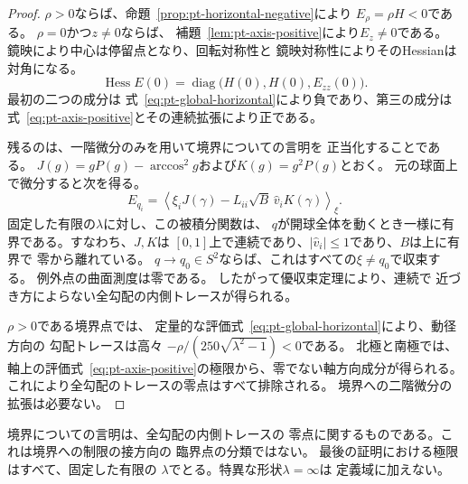 \begin{proof}
$\rho>0$ならば、命題~\ref{prop:pt-horizontal-negative}により
$E_\rho=\rho H<0$である。
$\rho=0$かつ$z\ne0$ならば、
補題~\ref{lem:pt-axis-positive}により$E_z\ne0$である。
鏡映により中心は停留点となり、回転対称性と
鏡映対称性によりそのHessianは対角になる。
\[
 \operatorname{Hess}E(0)
 =\operatorname{diag}\bigl(H(0),H(0),E_{zz}(0)\bigr).
\]
最初の二つの成分は
式~\eqref{eq:pt-global-horizontal}により負であり、第三の成分は
式~\eqref{eq:pt-axis-positive}とその連続拡張により正である。

残るのは、一階微分のみを用いて境界についての言明を
正当化することである。
$J(g)=gP(g)-\arccos^2g$および$K(g)=g^2P(g)$とおく。
元の球面上で微分すると次を得る。
\begin{equation}
 E_{q_i}=
 \left\langle
 \xi_iJ(\gamma)-L_{ii}\sqrt B\,\widehat v_iK(\gamma)
 \right\rangle_\xi .
\label{eq:pt-gradient-trace}
\end{equation}
固定した有限の$\lambda$に対し、この被積分関数は、
$q$が開球全体を動くとき一様に有界である。すなわち、$J,K$は
$[0,1]$上で連続であり、$|\widehat v_i|\leq1$であり、$B$は上に有界で
零から離れている。
$q\to q_0\in S^2$ならば、これはすべての$\xi\ne q_0$で収束する。
例外点の曲面測度は零である。
したがって優収束定理により、連続で
近づき方によらない全勾配の内側トレースが得られる。

$\rho>0$である境界点では、
定量的な評価式~\eqref{eq:pt-global-horizontal}により、動径方向の
勾配トレースは高々
$-\rho/(250\sqrt{\lambda^2-1})<0$である。
北極と南極では、
軸上の評価式~\eqref{eq:pt-axis-positive}の極限から、零でない軸方向成分が得られる。
これにより全勾配のトレースの零点はすべて排除される。
境界への二階微分の拡張は必要ない。
\end{proof}

境界についての言明は、全勾配の内側トレースの
零点に関するものである。これは境界への制限の接方向の
臨界点の分類ではない。
最後の証明における極限はすべて、固定した有限の
$\lambda$でとる。特異な形状$\lambda=\infty$は
定義域に加えない。

